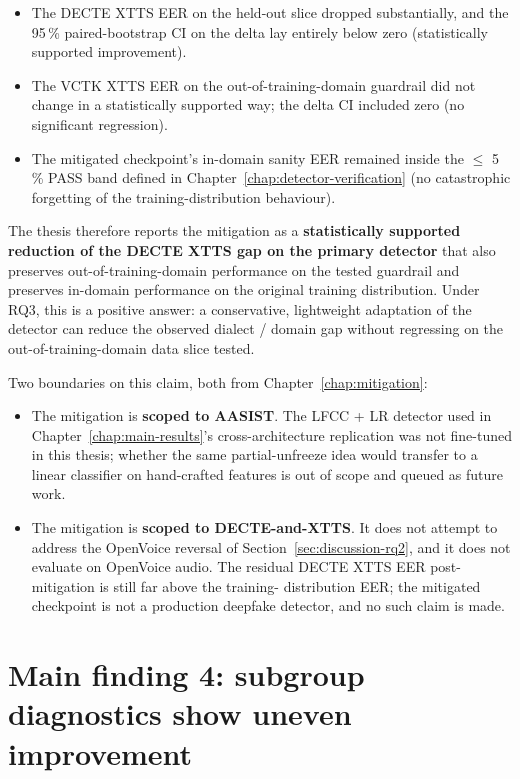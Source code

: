 \begin{itemize}
    \item The DECTE XTTS EER on the held-out slice dropped substantially,
        and the 95\,\% paired-bootstrap CI on the delta lay entirely
        below zero (statistically supported improvement).
    \item The VCTK XTTS EER on the out-of-training-domain guardrail did
        not change in a statistically supported way; the delta CI
        included zero (no significant regression).
    \item The mitigated checkpoint's in-domain sanity EER remained inside
        the $\leq$ 5\,\% PASS band defined in Chapter~\ref{chap:detector-verification} (no catastrophic
        forgetting of the training-distribution behaviour).
\end{itemize}

The thesis therefore reports the mitigation as a \textbf{statistically
supported reduction of the DECTE XTTS gap on the primary detector}
that also preserves out-of-training-domain performance on the
tested guardrail and preserves in-domain performance on the
original training distribution. Under RQ3, this is a positive
answer: a conservative, lightweight adaptation of the detector
can reduce the observed dialect / domain gap without regressing
on the out-of-training-domain data slice tested.

Two boundaries on this claim, both from Chapter~\ref{chap:mitigation}:

\begin{itemize}
    \item The mitigation is \textbf{scoped to AASIST}. The LFCC + LR detector
        used in Chapter~\ref{chap:main-results}'s cross-architecture replication was not
        fine-tuned in this thesis; whether the same partial-unfreeze
        idea would transfer to a linear classifier on hand-crafted
        features is out of scope and queued as future work.
    \item The mitigation is \textbf{scoped to DECTE-and-XTTS}. It does not
        attempt to address the OpenVoice reversal of Section~\ref{sec:discussion-rq2}, and
        it does not evaluate on OpenVoice audio. The residual DECTE
        XTTS EER post-mitigation is still far above the training-%
        distribution EER; the mitigated checkpoint is not a production
        deepfake detector, and no such claim is made.
\end{itemize}


\section{Main finding 4: subgroup diagnostics show uneven improvement}
\label{sec:discussion-rq4}

